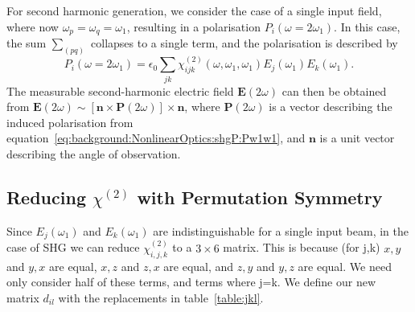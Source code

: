For second harmonic generation, we consider the case of a single input field, where now $\omega_{p}=\omega_{q}=\omega_{1}$, resulting in a polarisation $P_{i}(\omega=2\omega_{1} )$. In this case, the sum $\sum_{(pq)}$ collapses to a single term, and the polarisation is described by
\begin{equation}\label{eq:background:NonlinearOptics:shgP:Pw1w1}
	P_{i}(\omega=2\omega_{1} ) =  \epsilon_{0} \sum_{jk}
				\chi^{(2)}_{ijk}(\omega, \omega_{1},\omega_{1} ) 
				E_{j}(\omega_{1} ) E_{k}(\omega_{1} ).
\end{equation}
The measurable second-harmonic electric field $\mathbf{E}(2\omega)$ can then be obtained from $\mathbf{E}(2\omega)\sim[\mathbf{n}\times\mathbf{P}(2\omega)]\times\mathbf{n}$, where $\mathbf{P}(2\omega)$ is a vector describing the induced polarisation from equation~\ref{eq:background:NonlinearOptics:shgP:Pw1w1}, and $\mathbf{n}$ is a unit vector describing the angle of observation. 


\subsection{Reducing \texorpdfstring{$\chi^{(2)}$}{Lg} with Permutation Symmetry}\label{sec:background:NonlinearOptics:permutation}
Since $E_{j}(\omega_{1} )$ and $E_{k}(\omega_{1} )$ are indistinguishable for a single input beam, in the case of SHG we can reduce $\chi^{(2)}_{i, j, k}$ to a $3\times6$ matrix. This is because (for j,k) $x,y$ and $y,x$ are equal, $x,z$ and $z,x$ are equal, and $z,y$ and $y,z$ are equal. We need only consider half of these terms, and terms where j=k. We define our new matrix $d_{il}$ with the replacements in table~\ref{table:jkl}.


